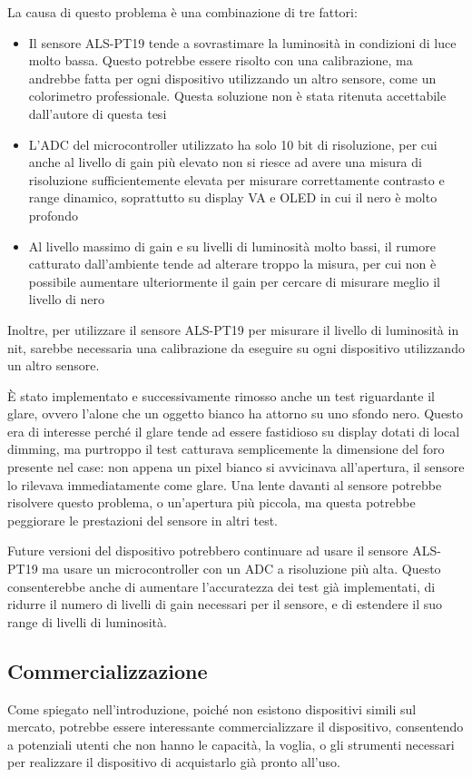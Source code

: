 La causa di questo problema è una combinazione di tre fattori:\begin{itemize}
	\item Il sensore ALS-PT19 tende a sovrastimare la luminosità in condizioni di luce molto bassa. Questo potrebbe essere risolto con una calibrazione, ma andrebbe fatta per ogni dispositivo utilizzando un altro sensore, come un colorimetro professionale. Questa soluzione non è stata ritenuta accettabile dall'autore di questa tesi
	\item L'ADC del microcontroller utilizzato ha solo 10 bit di risoluzione, per cui anche al livello di gain più elevato non si riesce ad avere una misura di risoluzione sufficientemente elevata per misurare correttamente contrasto e range dinamico, soprattutto su display VA e OLED in cui il nero è molto profondo
	\item Al livello massimo di gain e su livelli di luminosità molto bassi, il rumore catturato dall'ambiente tende ad alterare troppo la misura, per cui non è possibile aumentare ulteriormente il gain per cercare di misurare meglio il livello di nero
\end{itemize}

Inoltre, per utilizzare il sensore ALS-PT19 per misurare il livello di luminosità in nit, sarebbe necessaria una calibrazione da eseguire su ogni dispositivo utilizzando un altro sensore.

È stato implementato e successivamente rimosso anche un test riguardante il glare, ovvero l'alone che un oggetto bianco ha attorno su uno sfondo nero. Questo era di interesse perché il glare tende ad essere fastidioso su display dotati di local dimming, ma purtroppo il test catturava semplicemente la dimensione del foro presente nel case: non appena un pixel bianco si avvicinava all'apertura, il sensore lo rilevava immediatamente come glare. Una lente davanti al sensore potrebbe risolvere questo problema, o un'apertura più piccola, ma questa potrebbe peggiorare le prestazioni del sensore in altri test.

Future versioni del dispositivo potrebbero continuare ad usare il sensore ALS-PT19 ma usare un microcontroller con un ADC a risoluzione più alta. Questo consenterebbe anche di aumentare l'accuratezza dei test già implementati, di ridurre il numero di livelli di gain necessari per il sensore, e di estendere il suo range di livelli di luminosità.

\subsection{Commercializzazione}
Come spiegato nell'introduzione, poiché non esistono dispositivi simili sul mercato, potrebbe essere interessante commercializzare il dispositivo, consentendo a potenziali utenti che non hanno le capacità, la voglia, o gli strumenti necessari per realizzare il dispositivo di acquistarlo già pronto all'uso.

